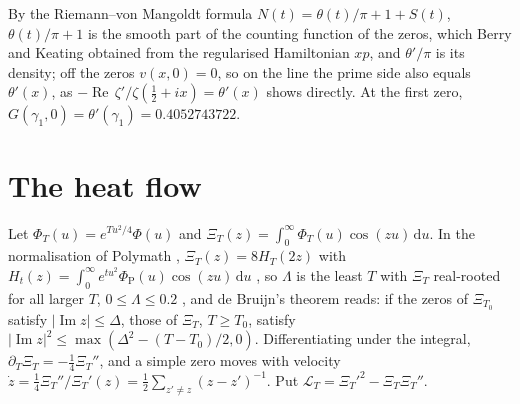 \documentclass[11pt]{article}
\theoremstyle{definition}\newtheorem{definition}[theorem]{Definition}
\theoremstyle{remark}\newtheorem{remark}[theorem]{Remark}
\newcommand{\dd}{\,\mathrm d}\newcommand{\e}{\mathrm e}
\renewcommand{\Re}{\operatorname{Re}}\renewcommand{\Im}{\operatorname{Im}}
\begin{document}
By the Riemann--von Mangoldt formula $N(t)=\theta(t)/\pi+1+S(t)$, $\theta(t)/\pi+1$ is the smooth part of the counting function of the zeros, which Berry and Keating \cite{BerryKeating} obtained from the regularised Hamiltonian $xp$, and $\theta'/\pi$ is its density; off the zeros $v(x,0)=0$, so on the line the prime side also equals $\theta'(x)$, as $-\Re\,\zeta'/\zeta(\frac12+ix)=\theta'(x)$ shows directly. At the first zero, $G(\gamma_1,0)=\theta'(\gamma_1)=0.4052743722$.

\section{The heat flow}\label{sec:heat}

Let $\Phi_T(u)=e^{Tu^2/4}\Phi(u)$ and $\Xi_T(z)=\int_0^\infty\Phi_T(u)\cos(zu)\dd u$. In the normalisation of Polymath \cite{Polymath}, $\Xi_T(z)=8H_T(2z)$ with $H_t(z)=\int_0^\infty e^{tu^2}\Phi_{\mathrm P}(u)\cos(zu)\dd u$ \cite{S03}, so $\Lambda$ is the least $T$ with $\Xi_T$ real-rooted for all larger $T$, $0\le\Lambda\le0.2$ \cite{RT,PT}, and de Bruijn's theorem \cite{deBruijn,Polymath} reads: if the zeros of $\Xi_{T_0}$ satisfy $|\Im z|\le\Delta$, those of $\Xi_T$, $T\ge T_0$, satisfy $|\Im z|^2\le\max(\Delta^2-(T-T_0)/2,0)$. Differentiating under the integral, $\partial_T\Xi_T=-\frac14\Xi_T''$, and a simple zero moves with velocity $\dot z=\frac14\Xi_T''/\Xi_T'(z)=\frac12\sum_{z'\ne z}(z-z')^{-1}$. Put $\mathcal L_T=\Xi_T'^2-\Xi_T\Xi_T''$.
\end{document}
